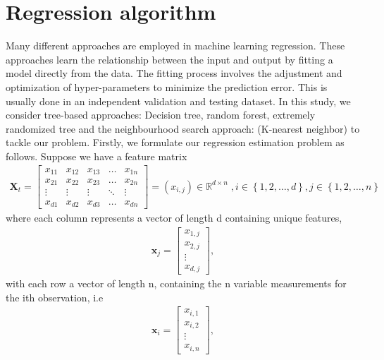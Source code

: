 \section{Regression algorithm} 
\label{algo1}
Many different approaches are employed in machine learning regression. These approaches learn the relationship between the input and output by fitting a model directly from the data. The fitting process involves the adjustment and optimization of hyper-parameters to minimize the prediction error. This is usually done in an independent validation and testing dataset. In this study, we consider tree-based approaches: Decision tree, random forest, extremely randomized tree and the neighbourhood search approach: (K-nearest neighbor) to tackle our problem. Firstly, we formulate our regression estimation problem as follows. Suppose we have a feature matrix 
\begin{align*}
\textbf{X}_{t}=\begin{bmatrix}
    x_{11} & x_{12} & x_{13} & \dots  & x_{1n} \\
    x_{21} & x_{22} & x_{23} & \dots  & x_{2n} \\
    \vdots & \vdots & \vdots & \ddots & \vdots \\
    x_{d1} & x_{d2} & x_{d3} & \dots  & x_{dn}
\end{bmatrix}=(x_{i,j}) \in  \mathbb{R}^{d \times n}\;, i\in \left\{1,2,\dots, d\right\}, j \in \left\{1,2,\dots,n\right\}
\end{align*}
where each column represents a vector of length d containing unique features, 
\begin{align*}
\textbf{x}_j=\begin{bmatrix}
    x_{1,j}  \\
    x_{2,j} \\
    \vdots \\
    x_{d,j} 
\end{bmatrix},
\end{align*}
with each row a vector of length n, containing the n variable measurements for the ith observation, i.e 
\begin{align*}
\textbf{x}_i=\begin{bmatrix}
    x_{i,1}  \\
    x_{i,2} \\
    \vdots \\
    x_{i,n} 
\end{bmatrix},
\end{align*}

